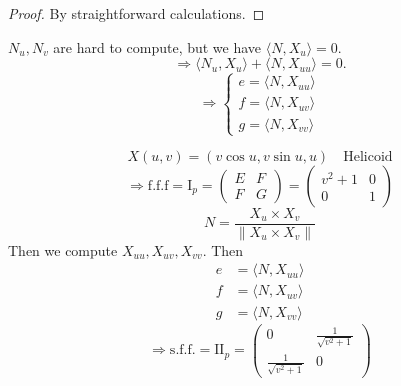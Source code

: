 \documentclass{article}
\begin{document}
\begin{proof}
By straightforward calculations.
\end{proof}

\begin{remark}
$N_u, N_v$ are hard to compute, but we have $\langle N, X_u \rangle = 0$.
$$ \Rightarrow \langle N_u, X_u \rangle + \langle N, X_{uu} \rangle = 0. $$
$$ \Rightarrow \begin{cases} e = \langle N, X_{uu} \rangle \\ f = \langle N, X_{uv} \rangle \\ g = \langle N, X_{vv} \rangle \end{cases} $$
\end{remark}

\begin{example}
$$ X(u, v) = (v \cos u, v \sin u, u) \quad \text{Helicoid} $$
$$ \Rightarrow \text{f.f.f} = \mathrm{I}_p = \begin{pmatrix} E & F \\ F & G \end{pmatrix} = \begin{pmatrix} v^2+1 & 0 \\ 0 & 1 \end{pmatrix} $$
$$ N = \frac{X_u \times X_v}{\| X_u \times X_v \|} $$
Then we compute $X_{uu}, X_{uv}, X_{vv}$.
Then
\begin{align*}
e &= \langle N, X_{uu} \rangle \\
f &= \langle N, X_{uv} \rangle \\
g &= \langle N, X_{vv} \rangle
\end{align*}
$$ \Rightarrow \text{s.f.f.} = \mathrm{II}_p = \begin{pmatrix} 0 & \frac{1}{\sqrt{v^2+1}} \\ \frac{1}{\sqrt{v^2+1}} & 0 \end{pmatrix} $$
\end{example}
\end{document}
